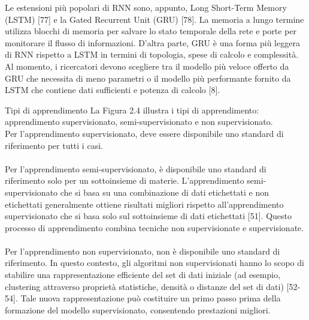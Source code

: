 \documentclass[12pt,a4paper]{report}
\begin{document}
Le estensioni più popolari di RNN sono, appunto, Long Short-Term Memory (LSTM) [77] e la Gated Recurrent Unit (GRU) [78]. La memoria a lungo termine utilizza blocchi di memoria per salvare lo stato temporale della rete e porte per monitorare il flusso di informazioni. D'altra parte, GRU è una forma più leggera di RNN rispetto a LSTM in termini di topologia, spese di calcolo e complessità. Al momento, i ricercatori devono scegliere tra il modello più veloce offerto da GRU che necessita di meno parametri o il modello più performante fornito da LSTM che contiene dati sufficienti e potenza di calcolo [8].\\

\begin{subsection}{Tipi di apprendimento}
La Figura 2.4 illustra i tipi di apprendimento: apprendimento supervisionato, semi-supervisionato e non supervisionato.\\
Per l'apprendimento supervisionato, deve essere disponibile uno standard di riferimento per tutti i casi.\\
\\
Per l'apprendimento semi-supervisionato, è disponibile uno standard di riferimento solo per un sottoinsieme di materie. L'apprendimento semi-supervisionato che si basa su una combinazione di dati etichettati e non etichettati generalmente ottiene risultati migliori rispetto all'apprendimento supervisionato che si basa solo sul sottoinsieme di dati etichettati [51]. Questo processo di apprendimento combina tecniche non supervisionate e supervisionate.\\
\\
Per l'apprendimento non supervisionato, non è disponibile uno standard di riferimento. In questo contesto, gli algoritmi non supervisionati hanno lo scopo di stabilire una rappresentazione efficiente del set di dati iniziale (ad esempio, clustering attraverso proprietà statistiche, densità o distanze del set di dati) [52-54]. Tale nuova rappresentazione può costituire un primo passo prima della formazione del modello supervisionato, consentendo prestazioni migliori.


\end{subsection}
\end{document}
